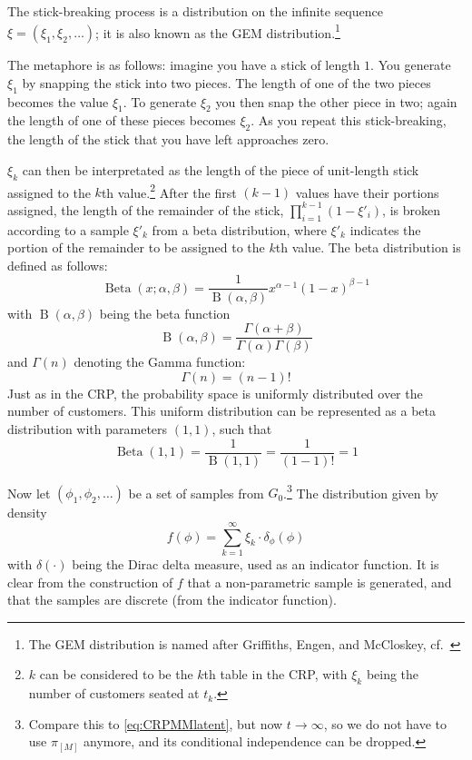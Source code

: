 The stick-breaking process\cite{Ishwaran2001Gibbs} is a distribution on the infinite sequence  $\xi = (\xi_1,\xi_2,\ldots)$; it is also known as the GEM distribution.\footnote{The GEM distribution is named after Griffiths, Engen, and McCloskey, cf.\ \cite{Pitman1997The}}

The metaphore is as follows: imagine you have a stick of length $1$. You generate $\xi_1$ by snapping the stick into two pieces. The length of one of the two pieces becomes the value $\xi_1$. To generate $\xi_2$ you then snap the other piece in two; again the length of one of these pieces becomes $\xi_2$. As you repeat this stick-breaking, the length of the stick that you have left approaches zero.

$\xi_k$ can then be interpretated as the length of the piece of unit-length stick assigned to the $k$th value.\footnote{$k$ can be considered to be the $k$th table in the CRP, with $\xi_k$ being the number of customers seated at $t_k$.} After the first $(k-1)$ values have their portions assigned, the length of the remainder of the stick, $\prod_{i=1}^{k-1}(1-\xi'_i)$, is broken according to a sample $\xi'_k$ from a beta distribution, where $\xi'_k$ indicates the portion of the remainder to be assigned to the $k$th value. The beta distribution is defined as follows:
\begin{equation} 
	\operatorname{Beta}(x; \alpha, \beta) = \frac{1}{\operatorname{B}(\alpha,\beta)}x^{\alpha-1}(1-x)^{\beta-1}
\end{equation}
with $\operatorname{B}(\alpha,\beta)$ being the beta function
\begin{equation}
	\operatorname{B}(\alpha,\beta) = \frac{\Gamma(\alpha+\beta)}{\Gamma(\alpha)\Gamma(\beta)}
\end{equation}
and $\Gamma(n)$ denoting the Gamma function:
\begin{equation}
	\Gamma(n) = (n-1)!
\end{equation} 
Just as in the CRP, the probability space is uniformly distributed over the number of customers. This uniform distribution can be represented as a beta distribution with parameters $(1,1)$, such that 
\begin{equation}
	\operatorname{Beta}(1,1)=\frac{1}{\operatorname{B}(1,1)} = \frac{1}{(1-1)!} = 1
\end{equation}

Now let $(\phi_1, \phi_2, \ldots)$ be a set of samples from $G_0$.\footnote{Compare this to \cref{eq:CRPMMlatent}, but now $t\rightarrow\infty$, so we do not have to use $\pi_{[M]}$ anymore, and its conditional independence can be dropped.} The distribution given by density 
\begin{equation}
	f(\phi) = \sum_{k=1}^\infty \xi_k \cdot \delta_{\phi}(\phi) 
\end{equation}
with $\delta(\cdot)$ being the Dirac delta measure, used as an indicator function. It is clear from the construction of $f$ that a non-parametric sample is generated, and that the samples are discrete (from the indicator function).



